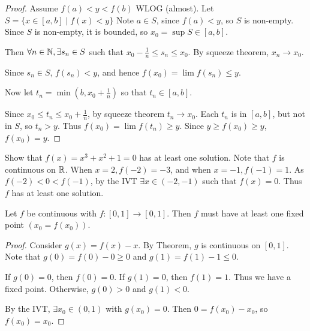 \documentclass{article}
\begin{document}
\begin{proof}
Assume $f(a) < y < f(b)$ WLOG (almost).
Let $S = \{x \in [a, b] \mid f(x) < y\}$
Note $a \in S$, since $f(a) < y$, so $S$ is non-empty.
Since $S$ is non-empty, it is bounded, so $x_0 = \sup S \in [a, b]$.

Then $\forall n \in \mathbb{N}, \exists s_n \in S$ such that $x_0 - \frac{1}{n}\leq s_n \leq x_0$. By squeeze theorem, $x_n \to x_0$.

Since $s_n \in S$, $f(s_n) < y$, and hence $f(x_0) = \lim f(s_n) \leq y$.

Now let $t_n = \min(b, x_0 + \frac{1}{n})$ so that $t_n \in [a, b]$.

Since $x_0 \leq t_n \leq x_0 + \frac{1}{n}$, by squeeze theorem $t_n \to x_0$. Each $t_n$ is in $[a, b]$, but not in $S$, so $t_n > y$.
Thus $f(x_0) = \lim f(t_n) \geq y$. Since $y \geq f(x_0) \geq y$, $f(x_0) = y$.
\end{proof}
\begin{example}
Show that $f(x) = x^3 + x^2 + 1 = 0$ has at least one solution. 
Note that $f$ is continuous on $\mathbb{R}$.
When $x = 2, f(-2) = -3$, and when $x=-1, f(-1) = 1$.
As $f(-2) < 0 < f(-1)$, by the IVT $\exists x \in (-2, -1)$ such that $f(x) = 0$. Thus $f$ has at least one solution. 
\end{example}
\begin{proposition}
Let $f$ be continuous with $f: [0, 1] \to [0, 1]$. Then $f$ must have at least one fixed point $(x_0 = f(x_0))$.
\end{proposition}
\begin{proof}
Consider $g(x) = f(x) - x$. By Theorem, $g$ is continuous on $[0, 1]$. Note that $g(0)= f(0) - 0 \geq 0$ and $g(1) = f(1) - 1 \leq 0$.

If $g(0)= 0$, then $f(0) = 0$.
If $g(1) = 0$, then $f(1) = 1$.
Thus we have a fixed point.
Otherwise, $g(0) > 0$ and $g(1) < 0$.

By the IVT, $\exists x_0 \in (0,1)$ with $g(x_0) = 0$. Then $0 = f(x_0) - x_0$, so $f(x_0) = x_0$.
\end{proof}
\end{document}
